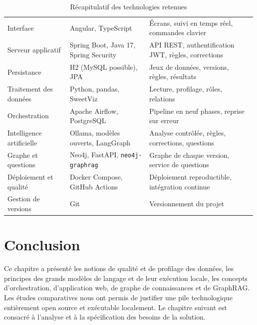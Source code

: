 \begin{table}[H]
\centering
\small
\begin{tabular}{|L{3.8cm}|L{4.2cm}|L{6cm}|}
\hline
{} &  &  \\ \hline
Interface & Angular, TypeScript & Écrans, suivi en temps réel, commandes clavier \\ \hline
Serveur applicatif & Spring Boot, Java 17, Spring Security & API REST, authentification JWT, règles, corrections \\ \hline
Persistance & H2 (MySQL possible), JPA & Jeux de données, versions, règles, résultats \\ \hline
Traitement des données & Python, pandas, SweetViz & Lecture, profilage, rôles, relations \\ \hline
Orchestration & Apache Airflow, PostgreSQL & Pipeline en neuf phases, reprise sur erreur \\ \hline
Intelligence artificielle & Ollama, modèles ouverts, LangGraph & Analyse contrôlée, règles, corrections, questions \\ \hline
Graphe et questions & Neo4j, FastAPI, \texttt{neo4j-graphrag} & Graphe de chaque version, service de questions \\ \hline
Déploiement et qualité & Docker Compose, GitHub Actions & Déploiement reproductible, intégration continue \\ \hline
Gestion de versions & Git & Versionnement du projet \\ \hline
\end{tabular}
\caption{Récapitulatif des technologies retenues}
\label{tab:recap-techno}
\end{table}

\section*{Conclusion}
Ce chapitre a présenté les notions de qualité et de profilage des données, les principes des grands modèles de langage et de leur exécution locale, les concepts d'orchestration, d'application web, de graphe de connaissances et de GraphRAG. Les études comparatives nous ont permis de justifier une pile technologique entièrement open source et exécutable localement. Le chapitre suivant est consacré à l'analyse et à la spécification des besoins de la solution.
